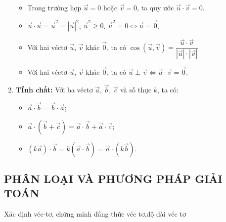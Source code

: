 \begin{enumerate}[\iconMT]
	 \begin{note}
	 \begin{itemize}
	 \item[\ding{172}] Trong trường hợp $\vec{u}=0$ hoặc $\vec{v}=0$, ta quy ước $\vec{u} \cdot \vec{v}=0$.
	 \item[\ding{173}] $\vec{u} \cdot \vec{u}=\vec{u}^2=|\vec{u}|^2$; \quad $\vec{u}^2 \geqslant 0$. $ \vec{u}^2 = 0 \Leftrightarrow \vec{u}=\vec{0}$.
	 \item[\ding{174}] Với hai véctơ $\vec{u}$, $\vec{v}$ khác $\vec{0}$, ta có $\cos (\vec{u},\vec{v}) = \dfrac{\vec{u} \cdot \vec{v}}{|\vec{u}| \cdot |\vec{v}|}$
	 \item[\ding{175}] Với hai véctơ $\vec{u}$, $\vec{v}$ khác $\vec{0}$, ta có $\vec{u} \perp \vec{v} \Leftrightarrow \vec{u} \cdot \vec{v}= \vec{0}$.
	 \end{itemize}
	 \end{note}
	\item \textbf{TÍnh chất:} Với ba véctơ $\vec{a}$, $\vec{b}$, $\vec{c}$ và số thực $k$, ta có:
	 \begin{itemize}	 
	 \item $\vec{a} \cdot \vec{b}= \vec{b} \cdot \vec{a}$;
	 \item $\vec{a} \cdot \left( {\vec{b} + \vec{c}} \right) = \vec{a} \cdot \vec{b} + \vec{a} \cdot \vec{c}$;
	 \item $(k\vec{a}) \cdot \vec{b}= k(\vec{a} \cdot \vec{b}) = \vec{a} \cdot (k\vec{b})$.
	\end{itemize}
\end{enumerate}
\subsection{PHÂN LOẠI VÀ PHƯƠNG PHÁP GIẢI TOÁN}
\begin{dang}{Xác định véc-tơ, chứng minh đẳng thức véc tơ,độ dài véc tơ}
\end{dang}
